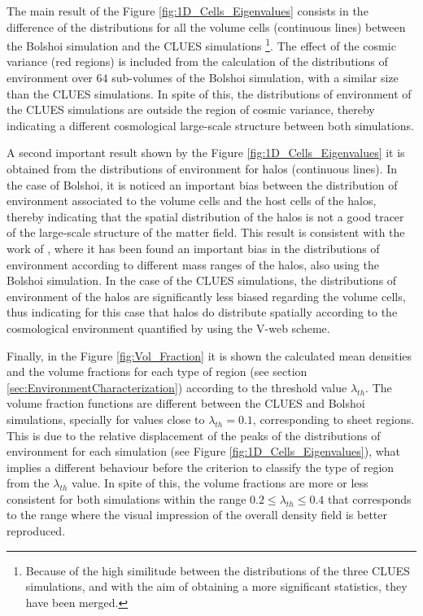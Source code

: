 The main result of the Figure \ref{fig:1D_Cells_Eigenvalues} consists in 
the difference of the distributions for all the volume cells (continuous 
lines) between the Bolshoi simulation and the CLUES simulations \footnote{ 
Because of the high similitude between the distributions of the three 
CLUES simulations, and with the aim of obtaining a more significant 
statistics, they have been merged.}. The effect of the cosmic variance 
(red regions) is included from the calculation of the distributions of 
environment over $64$ sub-volumes of the Bolshoi simulation, with a 
similar size than the CLUES simulations. In spite of this, the 
distributions of environment of the CLUES simulations are outside the 
region of cosmic variance, thereby indicating a different cosmological 
large-scale structure between both simulations.


A second important result shown by the Figure 
\ref{fig:1D_Cells_Eigenvalues} it is obtained from the distributions of
environment for halos (continuous lines). In the case of Bolshoi, it is
noticed an important bias between the distribution of environment 
associated to the volume cells and the host cells of the halos, thereby 
indicating that the spatial distribution of the halos is not a good tracer
of the large-scale structure of the matter field. This result is 
consistent with the work of \cite{libeskind2013}, where it has been found
an important bias in the distributions of environment according to 
different mass ranges of the halos, also using the Bolshoi simulation. In
the case of the CLUES simulations, the distributions of environment of the
halos are significantly less bia\-sed regarding the volume cells, thus 
indicating for this case that halos do distribute spatially according to
the cosmological environment quantified by using the V-web scheme.


Finally, in the Figure \ref{fig:Vol_Fraction} it is shown the calculated
mean densities and the vo\-lume fractions for each type of region (see 
section \ref{sec:EnvironmentCharacterization}) according to the threshold
value $\lambda_{th}$. The volume fraction functions are different between
the CLUES and Bolshoi simulations, specially for values close to 
$\lambda_{th} = 0.1$, corresponding to sheet regions. This is due to the 
relative displacement of the peaks of the distributions of environment for
each simulation (see Figure \ref{fig:1D_Cells_Eigenvalues}), what implies
a different behaviour before the criterion to classify the type of region 
from the $\lambda_{th}$ value. In spite of this, the volume fractions are
more or less consistent for both simulations within the range $0.2 \leq 
\lambda_{th} \leq 0.4$ that corresponds to the range where the visual 
impression of the overall density field is better reproduced.



